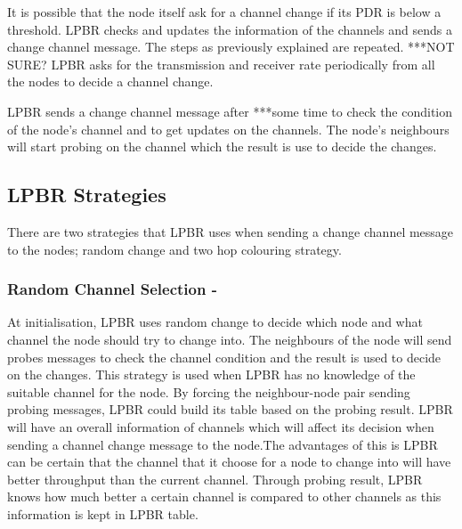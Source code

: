 It is possible that the node itself ask for a channel change if its PDR is below a threshold. LPBR checks and updates the information of the channels and sends a change channel message. The steps as previously explained are repeated. ***NOT SURE? LPBR asks for the transmission and receiver rate periodically from all the nodes to decide a channel change.

LPBR sends a change channel message after ***some time to check the condition of the node's channel and to get updates on the channels. The node's neighbours will start probing on the channel which the result is use to decide the changes.

\subsection{LPBR Strategies}   
There are two strategies that LPBR uses when sending a change channel message to the nodes; random change and two hop colouring strategy. 

\subsubsection{Random Channel Selection -}
At initialisation, LPBR uses random change to decide which node and what channel the node should try to change into. The neighbours of the node will send probes messages to check the channel condition and the result is used to decide on the changes. This strategy is used when LPBR has no knowledge of the suitable channel for the node. By forcing the neighbour-node pair sending probing messages, LPBR could build its table based on the probing result. LPBR will have an overall information of channels which will affect its decision when sending a channel change message to the node.The advantages of this is LPBR can be certain that the channel that it choose for a node to change into will have better throughput than the current channel. Through probing result, LPBR knows how much better a certain channel is compared to other channels as this information is kept in LPBR table. 
	
